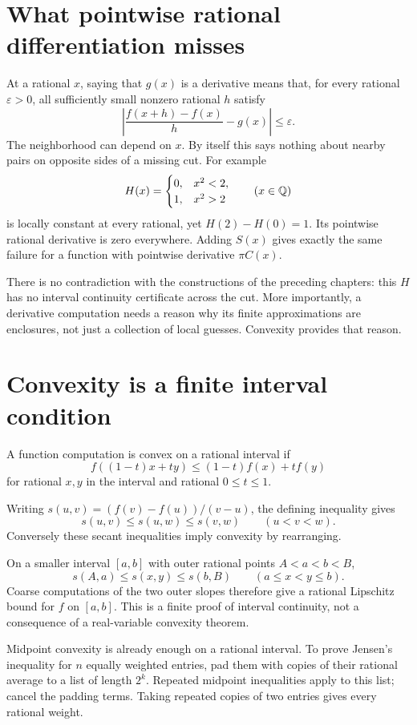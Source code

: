 \section{What pointwise rational differentiation misses}
At a rational $x$, saying that $g(x)$ is a derivative means that, for every
rational $\varepsilon>0$, all sufficiently small nonzero rational $h$
satisfy
\[
 \left|\frac{f(x+h)-f(x)}h-g(x)\right|\le\varepsilon.
\]
The neighborhood can depend on $x$.  By itself this says nothing about
nearby pairs on opposite sides of a missing cut.  For example
\[
 H(x)=\begin{cases}0,&x^2<2,\\1,&x^2>2\end{cases}\qquad(x\in\mathbb{Q})
\]
is locally constant at every rational, yet $H(2)-H(0)=1$.  Its pointwise
rational derivative is zero everywhere.  Adding $S(x)$ gives exactly the
same failure for a function with pointwise derivative $\pi C(x)$.

There is no contradiction with the constructions of the preceding chapters:
this $H$ has no interval continuity certificate across the cut.  More
importantly, a derivative computation needs a reason why its finite
approximations are enclosures, not just a collection of local guesses.
Convexity provides that reason.

\section{Convexity is a finite interval condition}
\begin{definition}
A function computation is convex on a rational interval if
\[
 f((1-t)x+ty)\le(1-t)f(x)+tf(y)
\]
for rational $x,y$ in the interval and rational $0\le t\le1$.
\end{definition}
Writing $s(u,v)=(f(v)-f(u))/(v-u)$, the defining inequality gives
\[
 s(u,v)\le s(u,w)\le s(v,w)\qquad(u<v<w).
\]
Conversely these secant inequalities imply convexity by rearranging.

On a smaller interval $[a,b]$ with outer rational points $A<a<b<B$,
\[
 s(A,a)\le s(x,y)\le s(b,B)\qquad(a\le x<y\le b).
\]
Coarse computations of the two outer slopes therefore give a rational
Lipschitz bound for $f$ on $[a,b]$.  This is a finite proof of interval
continuity, not a consequence of a real-variable convexity theorem.

Midpoint convexity is already enough on a rational interval.  To prove
Jensen's inequality for $n$ equally weighted entries, pad them with copies
of their rational average to a list of length $2^k$.  Repeated midpoint
inequalities apply to this list; cancel the padding terms.  Taking repeated
copies of two entries gives every rational weight.

